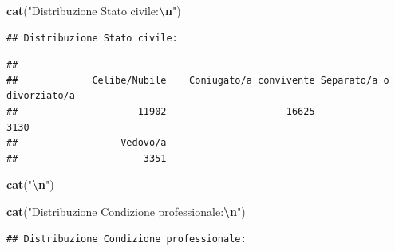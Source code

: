 \documentclass[
]{article}
\newenvironment{Shaded}{\begin{snugshade}}{\end{snugshade}}
\newcommand{\FunctionTok}[1]{\textcolor[rgb]{0.13,0.29,0.53}{\textbf{#1}}}
\newcommand{\NormalTok}[1]{#1}
\newcommand{\SpecialCharTok}[1]{\textcolor[rgb]{0.81,0.36,0.00}{\textbf{#1}}}
\newcommand{\StringTok}[1]{\textcolor[rgb]{0.31,0.60,0.02}{#1}}
\begin{document}
\begin{Shaded}
\begin{Highlighting}[]
\FunctionTok{cat}\NormalTok{(}\StringTok{"Distribuzione Stato civile:}\SpecialCharTok{\textbackslash{}n}\StringTok{"}\NormalTok{)}
\end{Highlighting}
\end{Shaded}

\begin{verbatim}
## Distribuzione Stato civile:
\end{verbatim}

\begin{Shaded}
\end{Shaded}

\begin{verbatim}
## 
##             Celibe/Nubile    Coniugato/a convivente Separato/a o divorziato/a 
##                     11902                     16625                      3130 
##                  Vedovo/a 
##                      3351
\end{verbatim}

\begin{Shaded}
\begin{Highlighting}[]
\FunctionTok{cat}\NormalTok{(}\StringTok{"}\SpecialCharTok{\textbackslash{}n}\StringTok{"}\NormalTok{)}
\end{Highlighting}
\end{Shaded}

\begin{Shaded}
\begin{Highlighting}[]
\FunctionTok{cat}\NormalTok{(}\StringTok{"Distribuzione Condizione professionale:}\SpecialCharTok{\textbackslash{}n}\StringTok{"}\NormalTok{)}
\end{Highlighting}
\end{Shaded}

\begin{verbatim}
## Distribuzione Condizione professionale:
\end{verbatim}

\begin{Shaded}
\end{Shaded}
\end{document}
